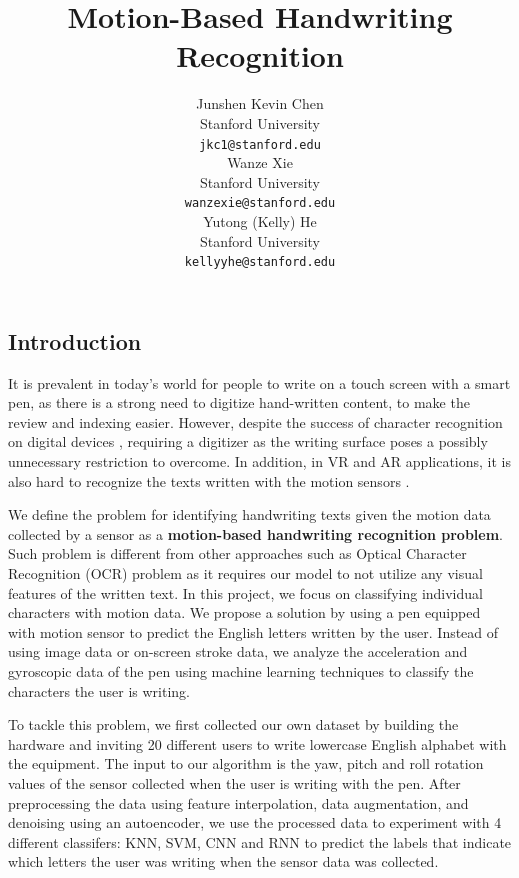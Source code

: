 \documentclass{article}
\title{Motion-Based Handwriting Recognition }
\author{
  Junshen Kevin Chen \\
  Stanford University\\
  \texttt{jkc1@stanford.edu} \\
   \And
  Wanze Xie \\
  Stanford University\\
  \texttt{wanzexie@stanford.edu} \\
    \And
  Yutong (Kelly)  He \\
  Stanford University\\
  \texttt{kellyyhe@stanford.edu} \\
}
\begin{document}
\maketitle


\begin{multicols*}{2}

\section{Introduction}

It is prevalent in today’s world for people to write on a touch screen with a smart pen, as there is a strong need to digitize hand-written content, to make the review and indexing easier. However, despite the success of character recognition on digital devices \cite{bib1, bib2, bib3}, requiring a digitizer as the writing surface poses a possibly unnecessary restriction to overcome. In addition, in VR and AR applications, it is also hard to recognize the texts written with the motion sensors \cite{bib4, bib5}.

We define the problem for identifying handwriting texts given the motion data collected by a sensor as a \textbf{motion-based handwriting recognition problem}. Such problem is different from other approaches such as Optical Character Recognition (OCR)\cite{ocr} problem as it requires our model to not utilize any visual features of the written text. In this project, we focus on classifying individual characters with motion data. We propose a solution by using a pen equipped with motion sensor to predict the English letters written by the user. Instead of using image data or on-screen stroke data, we analyze the acceleration and gyroscopic data of the pen using machine learning techniques to classify the characters the user is writing.

To tackle this problem, we first collected our own dataset by building the hardware and inviting 20 different users to write lowercase English alphabet with the equipment. The input to our algorithm is the yaw, pitch and roll rotation values of the sensor collected when the user is writing with the pen. After preprocessing the data using feature interpolation, data augmentation, and denoising using an autoencoder, we use the processed data to experiment with 4 different classifers: KNN, SVM, CNN and RNN to predict the labels that indicate which letters the user was writing when the sensor data was collected.


\end{multicols*}
\end{document}
